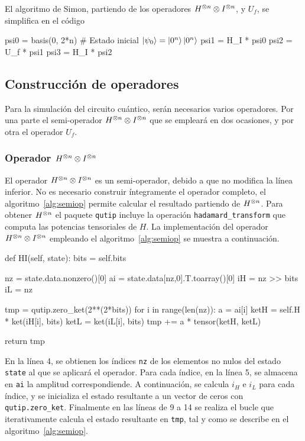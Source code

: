 El algoritmo de Simon, partiendo de los operadores ${H}^{\otimes n} \otimes {I}^{\otimes n}$, 
y $U_f$, se simplifica en el código
%
\begin{pycode}
psi0 = basis(0, 2*n) # Estado inicial $\ket{\psi_{0}} = \ket{0^n}\ket{0^n}$
psi1 = H_I * psi0
psi2 = U_f * psi1
psi3 = H_I * psi2
\end{pycode}
\subsection{Construcción de operadores}
Para la simulación del circuito cuántico, serán necesarios varios operadores.
Por una parte el semi-operador ${H}^{\otimes n} \otimes {I}^{\otimes n}$ que se empleará en 
dos ocasiones, y por otra el operador $U_f$.

\subsubsection{Operador ${H}^{\otimes n} \otimes {I}^{\otimes n} $}
El operador ${H}^{\otimes n} \otimes {I}^{\otimes n}$ es un semi-operador, debido a que no 
modifica la línea inferior. No es necesario construir íntegramente el operador 
completo, el algoritmo~\ref{alg:semiop} permite calcular el resultado partiendo 
de ${H}^{\otimes n}$.
%
Para obtener ${H}^{\otimes n}$ el paquete \texttt{qutip} incluye la operación 
\texttt{hadamard\_transform} que computa las potencias tensoriales de $H$. La 
implementación del operador ${H}^{\otimes n} \otimes {I}^{\otimes n} $ empleando el 
algoritmo~\ref{alg:semiop} se muestra a continuación.
%
\begin{pycode}
def HI(self, state):
	bits = self.bits

	nz = state.data.nonzero()[0]
	ai = state.data[nz,0].T.toarray()[0]
	iH = nz >> bits
	iL = nz %

	tmp = qutip.zero_ket(2**(2*bits))
	for i in range(len(nz)):
		a = ai[i]
		ketH = self.H * ket(iH[i], bits)
		ketL = ket(iL[i], bits)
		tmp += a * tensor(ketH, ketL)

	return tmp
\end{pycode}
%
En la línea 4, se obtienen los índices \texttt{nz} de los elementos no nulos del 
estado \texttt{state} al que se aplicará el operador. Para cada índice, en la 
línea 5, se almacena en \texttt{ai} la amplitud correspondiende. A continuación, 
se calcula $i_H$ e $i_L$ para cada índice, y se inicializa el estado resultante 
a un vector de ceros con \texttt{qutip.zero\_ket}. Finalmente en las líneas de 9 
a 14 se realiza el bucle que iterativamente calcula el estado resultante  en 
\texttt{tmp}, tal y como se describe en el algoritmo~\ref{alg:semiop}.

